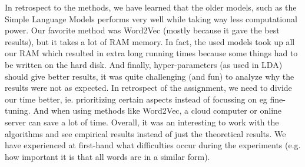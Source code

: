 In retrospect to the methods, we have learned that the older models, such as the Simple Language Models performs very well while taking way less computational power. Our favorite method was Word2Vec (mostly because it gave the best results), but it takes a lot of RAM memory. In fact, the used models took up all our RAM which resulted in extra long running times because some things had to be written on the hard disk.
And finally, hyper-parameters (as used in LDA) should give better results, it was quite challenging (and fun) to analyze why the results were not as expected.
\newline
\newline
In retrospect of the assignment, we need to divide our time better, ie. prioritizing certain aspects instead of focussing on eg fine-tuning. And when using methods like Word2Vec, a cloud computer or online server can save a lot of time.
\newline
\newline
Overall, it was an interesting to work with the algorithms and see empirical results instead of just the theoretical results. We have experienced at first-hand what difficulties occur during the experiments (e.g. how important it is that all words are in a similar form).